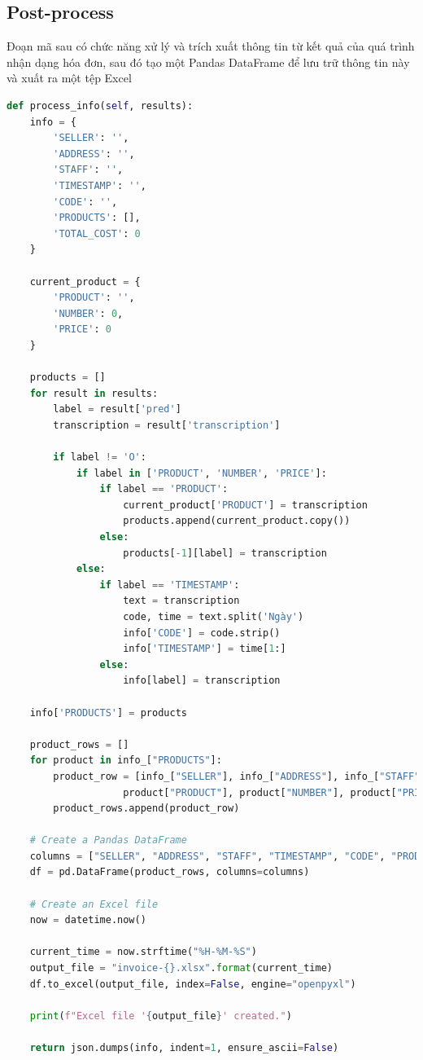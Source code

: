 \subsection{Post-process}
Đoạn mã sau có chức năng xử lý và trích xuất thông tin từ kết quả của quá trình nhận dạng hóa đơn, sau đó tạo một Pandas DataFrame để lưu trữ thông tin này và xuất ra một tệp Excel

\begin{lstlisting}[language=Python]
def process_info(self, results):
    info = {
        'SELLER': '',
        'ADDRESS': '',
        'STAFF': '',
        'TIMESTAMP': '',
        'CODE': '',
        'PRODUCTS': [],
        'TOTAL_COST': 0
    }
    
    current_product = {
        'PRODUCT': '',
        'NUMBER': 0,
        'PRICE': 0
    }
    
    products = []
    for result in results:
        label = result['pred']
        transcription = result['transcription']
        
        if label != 'O':
            if label in ['PRODUCT', 'NUMBER', 'PRICE']:
                if label == 'PRODUCT':
                    current_product['PRODUCT'] = transcription
                    products.append(current_product.copy())
                else:
                    products[-1][label] = transcription
            else: 
                if label == 'TIMESTAMP':
                    text = transcription
                    code, time = text.split('Ngày')
                    info['CODE'] = code.strip()
                    info['TIMESTAMP'] = time[1:]
                else:
                    info[label] = transcription
                    
    info['PRODUCTS'] = products 

    product_rows = []
    for product in info_["PRODUCTS"]:
        product_row = [info_["SELLER"], info_["ADDRESS"], info_["STAFF"], info_["TIMESTAMP"], info_["CODE"],
                    product["PRODUCT"], product["NUMBER"], product["PRICE"], info_["TOTAL_COST"]]
        product_rows.append(product_row)

    # Create a Pandas DataFrame
    columns = ["SELLER", "ADDRESS", "STAFF", "TIMESTAMP", "CODE", "PRODUCT", "NUMBER", "PRICE", "TOTAL_COST"]
    df = pd.DataFrame(product_rows, columns=columns)

    # Create an Excel file
    now = datetime.now()

    current_time = now.strftime("%H-%M-%S")
    output_file = "invoice-{}.xlsx".format(current_time)
    df.to_excel(output_file, index=False, engine="openpyxl")

    print(f"Excel file '{output_file}' created.")

    return json.dumps(info, indent=1, ensure_ascii=False)
\end{lstlisting}

